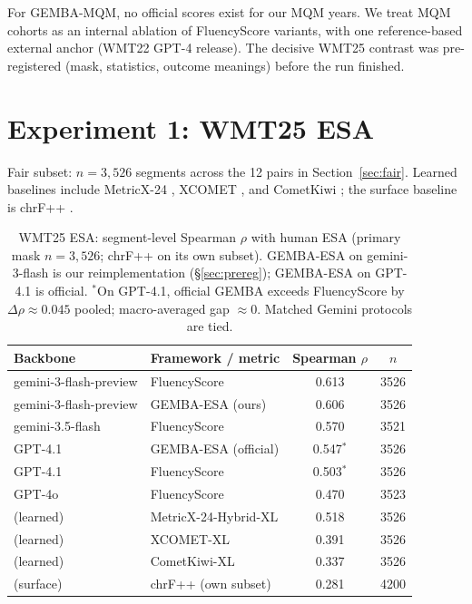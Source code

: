 \documentclass[11pt]{article}
\newcommand{\FS}{FluencyScore}
\begin{document}
For GEMBA-MQM, no official scores exist for our MQM years.
We treat MQM cohorts as an internal ablation of \FS{} variants, with one
reference-based external anchor (WMT22 GPT-4 release).
The decisive WMT25 contrast was pre-registered (mask, statistics, outcome
meanings) before the run finished.

\section{Experiment 1: WMT25 ESA}
\label{sec:exp1}
Fair subset: $n{=}3{,}526$ segments across the 12 pairs in
Section~\ref{sec:fair}.
Learned baselines include MetricX-24 \cite{juraska-etal-2024-metricx}, XCOMET \cite{guerreiro-etal-2024-xcomet}, and CometKiwi \cite{rei-etal-2022-cometkiwi}; the surface baseline is chrF++ \cite{popovic-2015-chrf}.

\begin{table}[t]
\centering
\scriptsize
\caption{WMT25 ESA: segment-level Spearman $\rho$ with human ESA (primary mask $n{=}3{,}526$; chrF++ on its own subset). GEMBA-ESA on gemini-3-flash is our reimplementation (\S\ref{sec:prereg}); GEMBA-ESA on GPT-4.1 is official. $^*$On GPT-4.1, official GEMBA exceeds \FS{} by $\Delta\rho{\approx}0.045$ pooled; macro-averaged gap ${\approx}0$. Matched Gemini protocols are tied.}
\label{tab:1}
\begin{tabularx}{\columnwidth}{>{\raggedright\arraybackslash}X>{\raggedright\arraybackslash}Xcc}
\toprule
Backbone & Framework / metric & Spearman $\rho$ & $n$ \\
\midrule
gemini-3-flash-preview & \FS{} & 0.613 & 3526 \\
gemini-3-flash-preview & GEMBA-ESA (ours) & 0.606 & 3526 \\
gemini-3.5-flash & \FS{} & 0.570 & 3521 \\
GPT-4.1 & GEMBA-ESA (official) & 0.547$^*$ & 3526 \\
GPT-4.1 & \FS{} & 0.503$^*$ & 3526 \\
GPT-4o & \FS{} & 0.470 & 3523 \\
(learned) & MetricX-24-Hybrid-XL & 0.518 & 3526 \\
(learned) & XCOMET-XL & 0.391 & 3526 \\
(learned) & CometKiwi-XL & 0.337 & 3526 \\
(surface) & chrF++ (own subset) & 0.281 & 4200 \\
\bottomrule
\end{tabularx}

\end{table}
\end{document}
